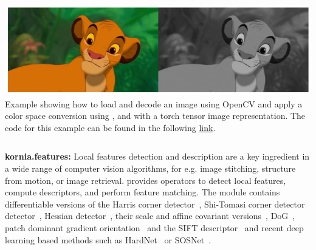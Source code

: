 \vspace{.5cm}

\begin{tcolorbox}[every float=\centering, drop shadow, title=Example 2: Color Space Conversion]
    \label{fig:examples:color}
    \includegraphics[width=1.\linewidth]{main/chapter03/data/examples/color_simba.jpg}
    {Example showing how to load and decode an image using OpenCV and apply a color space conversion using \lib{}, and with a torch tensor image representation. The code for this example can be found in the following \underline{\color{blue}\href{https://colab.research.google.com/drive/1dgT9-QLZiTjxPK9Ej4YnyV953uTQKBCm}{link}}.}
    \inputminted[python3, baselinestretch=1., style=vs, fontfamily=courier, fontsize=\footnotesize, funcnamehighlighting=true]{python}{main/chapter03/data/examples/snipet_color.py}
\end{tcolorbox}

\newpage

\noindent\textbf{kornia.features:} Local features detection and description are a key ingredient in a wide range of computer vision algorithms, for e.g. image stitching, structure from motion, or image retrieval. \lib{} provides operators to detect local features, compute descriptors, and perform feature matching. The module contains differentiable versions of the Harris corner detector~\citep{Harris88}, Shi-Tomasi corner detector detector~\citep{Shi94goodfeatures}, Hessian detector~\citep{Hessian78},  their scale and affine covariant versions~\citep{Mikolajczyk2004}, DoG~\citep{Lowe2004}, patch dominant gradient orientation~\citep{Lowe2004} and the SIFT descriptor~\citep{Lowe2004} and recent deep learning based methods such as HardNet~\citep{mishchuk2017working} or SOSNet~\citep{tian2019sosnet}. %

